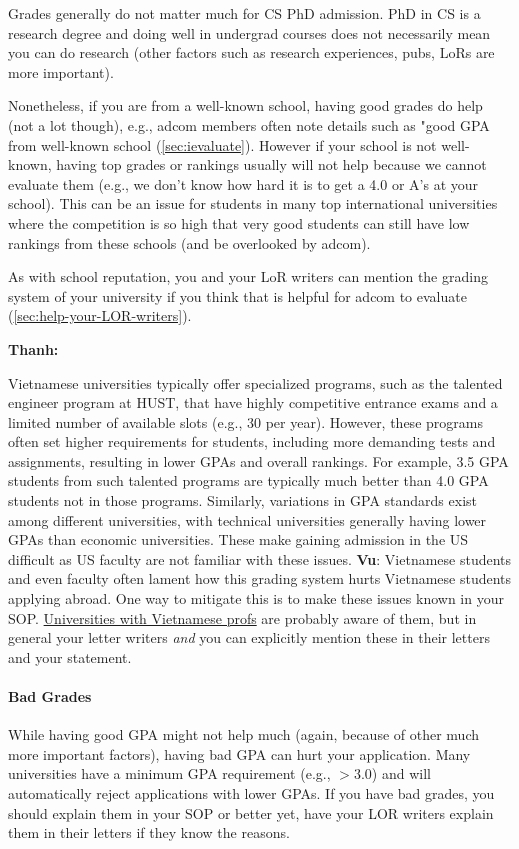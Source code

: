 \documentclass[oneside,11pt,dvipsnames]{book}
\newenvironment{commentbox}[1][]{
  \small
  \begin{mybox}
    {\small \textbf{#1}}
  }{
  \end{mybox}
}
\begin{document}
Grades generally do not matter much for CS PhD admission. PhD in CS is a research degree and doing well in undergrad courses does not necessarily mean you can do research (other factors such as research experiences, pubs, LoRs are more important).

Nonetheless, if you are from a well-known school, having good grades do help (not a lot though), e.g., adcom members often note details such as "good GPA from well-known school (\autoref{sec:ievaluate}). However if your school is not well-known, having top grades or rankings usually will not help because we cannot evaluate them (e.g., we don't know how hard it is to get a 4.0 or A's at your school). This can be an issue for students in many top international universities where the competition is so high that very good students can still have low rankings from these schools (and be overlooked by adcom).

As with school reputation, you and your LoR writers can mention the grading system of your university if you think that is helpful for adcom to evaluate (\autoref{sec:help-your-LOR-writers}).


\begin{commentbox}[Thanh:]
    Vietnamese universities typically offer specialized programs, such as the talented engineer program at HUST, that have highly competitive entrance exams and a limited number of available slots (e.g., 30 per year). However, these programs often set higher requirements for students, including more demanding tests and assignments, resulting in lower GPAs and overall rankings. For example, 3.5 GPA students from such talented programs are typically much better than 4.0 GPA students not in those programs.  Similarly, variations in GPA standards exist among different universities, with technical universities generally having lower GPAs than economic universities. These make gaining admission in the US difficult as US faculty are not familiar with these issues.
    \tcblower
    \textbf{Vu}: Vietnamese students and even faculty often lament how this grading system hurts Vietnamese students applying abroad. One way to mitigate this is to make these issues known in your SOP.  \href{https://github.com/dynaroars/dynaroars.github.io/wiki/Viet-CS-Profs-US}{Universities with Vietnamese profs} are probably aware of them, but in general your letter writers \emph{and} you can explicitly mention these in their letters and your statement.
  \end{commentbox}

  
\paragraph{Bad Grades} 
While having good GPA might not help much (again, because of other much more important factors),
having bad GPA can hurt your application.  Many universities have a minimum GPA requirement (e.g., $> 3.0$) and will automatically reject applications with lower GPAs.  
If you have bad grades, you should explain them in your SOP or better yet, have your LOR writers explain them in their letters if they know the reasons.
\end{document}
